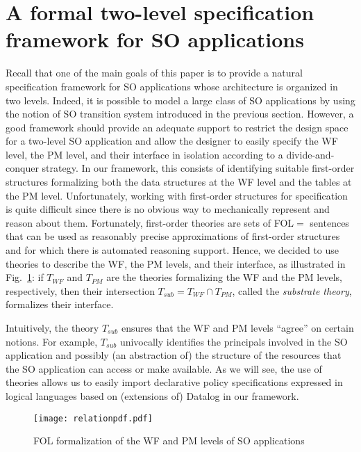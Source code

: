 \documentclass[conference]{IEEEtran}
\begin{document}
\section{A formal two-level specification framework  for SO applications}\label{sec:framework}
Recall that one of the main goals of this paper is to
provide a natural specification framework for SO applications whose
architecture is organized in two levels.  Indeed, it is possible to
model a large class of SO applications by using the notion of SO
transition system introduced in the previous section.  However, a good
framework should provide an adequate support to restrict the design
space for a two-level SO application and allow the designer to easily
specify the WF level, the PM level, and their interface in isolation
according to a divide-and-conquer strategy.  In our framework, this
consists of identifying suitable first-order structures formalizing
both the data structures at the WF level and the tables at the PM
level.  Unfortunately, working with first-order structures for
specification is quite difficult since there is no obvious way to
mechanically represent and reason about them.  Fortunately,
first-order theories are sets of FOL$=$ sentences that can be used as
reasonably precise approximations of first-order structures and for
which there is automated reasoning support.  Hence, we decided to use
theories to describe the WF, the PM levels, and their interface, as illustrated in 
Fig.~\ref{fig:ths-rels}: if $T_\mathit{WF}$ and $T_\mathit{PM}$ are the theories 
formalizing the WF and the PM levels, respectively, then their intersection $T_\mathit{sub} = T_\mathit{WF} \cap
T_\mathit{PM}$, called the \emph{substrate theory}, formalizes their interface.

Intuitively, the theory $T_\mathit{sub}$ ensures that the WF and PM levels
``agree'' on certain notions. For example, $T_\mathit{sub}$ univocally
identifies the principals involved in the SO application and possibly
(an abstraction of) the {structure} of the resources that the SO
application can access or make available.  As we will see, the use of
theories allows us to easily import declarative policy specifications
expressed in logical languages based on (extensions of) Datalog in our
framework.
\label{sec:modelling}
\begin{figure}[tb]
\centering
\vspace*{-0.2cm}
\texttt{[image: relationpdf.pdf]}
\vspace*{-0.5cm}
\caption{\label{fig:ths-rels}FOL formalization of the WF and PM levels
  of SO applications}
\end{figure}
\end{document}
